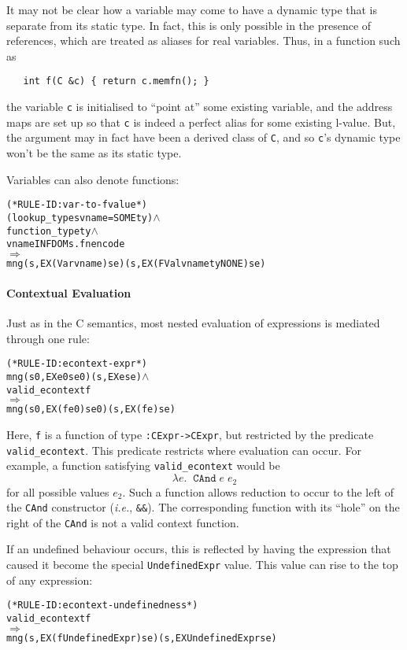 \documentclass[11pt]{article}
\newcommand{\ie}{\emph{i.e.}}
\begin{document}
It may not be clear how a variable may come to have a dynamic type
that is separate from its static type.  In fact, this is only possible
in the presence of references, which are treated as aliases for real
variables.  Thus, in a function such as
\begin{verbatim}
   int f(C &c) { return c.memfn(); }
\end{verbatim}
the variable \texttt{c} is initialised to ``point at'' some existing
variable, and the address maps are set up so that \texttt{c} is indeed
a perfect alias for some existing l-value.  But, the argument may in
fact have been a derived class of \texttt{C}, and so \texttt{c}'s
dynamic type won't be the same as its static type.

Variables can also denote functions:
%
%
\begin{alltt}
(* RULE-ID: var-to-fvalue *)
     (lookup_type s vname = SOME ty) \(\land\)
     function_type ty \(\land\)
     vname IN FDOM s.fnencode
   \(\Rightarrow\)
     mng (s, EX (Var vname) se) (s, EX (FVal vname ty NONE) se)
\end{alltt}


\paragraph{Contextual Evaluation}
Just as in the C semantics, most nested evaluation of expressions is
mediated through one rule: \label{rule:econtext-expr}
\begin{alltt}
(* RULE-ID: econtext-expr *)
     mng (s0, EX e0 se0) (s, EX e se) \(\land\)
     valid_econtext f
   \(\Rightarrow\)
     mng (s0, EX (f e0) se0) (s, EX (f e) se)
\end{alltt}
Here, \texttt{f} is a function of type \texttt{:CExpr->CExpr},
but restricted by the predicate \texttt{valid_econtext}.  This
predicate restricts where evaluation can occur.  For example, a
function satisfying \texttt{valid_econtext} would be
\[
\lambda e.\;\;\texttt{CAnd}\;e\;e_2
\]
for all possible values $e_2$.  Such a function allows reduction to
occur to the left of the \texttt{CAnd} constructor (\ie,
\texttt{\&\&}).  The corresponding function with its ``hole'' on the
right of the \texttt{CAnd} is not a valid context function.

If an undefined behaviour occurs, this is reflected by having the
expression that caused it become the special \texttt{UndefinedExpr}
value.  This value can rise to the top of any expression:
%
\begin{alltt}
(* RULE-ID: econtext-undefinedness *)
     valid_econtext f
   \(\Rightarrow\)
     mng (s, EX (f UndefinedExpr) se) (s, EX UndefinedExpr se)
\end{alltt}
\end{document}
